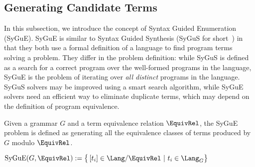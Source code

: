 \begin{comment}
Also each method or value type used is defined at some time by the user, these definitions are used to create rewrite rules and later further rewrite the terms. 
There are different limitations to this type of system, first of all speed, the system needs to find matches to known rules and works as a high level interpreter. 
Another important limitation is the program space reachable with the rewrite system. 
This rewrite system proves equivalences therefor has the same limitation as provability. 
In addition to the theoretical limit there are unknown and needed rewrite rules for some comparisons, although some will be found in later iterations there is no promise all will be found. 
In order to translate even the simplest terms to equality certain rewrite rules are needed beforehand, for example \lstinline{1 + (x + 1) = (1 + x) + 1}. 
Without having a rewrite about addition being associative this equality will not be found. 
This seems like a huge limitation but as we will see later our system proves the rewrite rules it needs during its process and the function and type definitions provide most needed knowledge. 
As a result providing a set of rewrite rules for the builtins in the language is almost all user knowledge needed.
\end{comment}

\subsection{Generating Candidate Terms}
\label{generation}

In this subsection, we introduce the concept of Syntax Guided Enumeration (SyGuE).
SyGuE is similar to Syntax Guided Synthesis (SyGuS for short~\cite{DSSE2015:Alur}) in that they both use a formal definition of a language to find program terms solving a problem.
They differ in the problem definition: while SyGuS is defined as a search for a correct program over the well-formed programs in the language,
SyGuE is the problem of iterating over \emph{all distinct} programs in the language. SyGuS solvers may be improved using a smart search algorithm, while SyGuE solvers need an efficient way to eliminate duplicate terms, which may depend on the definition of program equivalence.

\begin{definition}[SyGuE]
Given a grammar $G$ and a term equivalence relation $\EquivRel$, the SyGuE problem is defined as generating all the equivalence classes of terms produced by
$G$ modulo $\EquivRel$.

\vspace{8pt}
\centering
$
    \textrm{SyGuE}(G,\EquivRel) := \big\{ \left[t_i\right] \in \Lang/\EquivRel
     ~\vert~ t_i \in \Lang_G \big\}
$
\end{definition}

